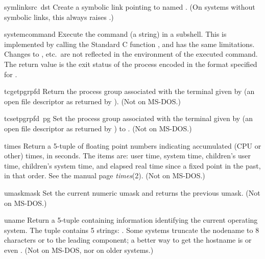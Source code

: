 \begin{funcdesc}{symlink}{src\, dst}
Create a symbolic link pointing to  named .  (On
systems without symbolic links, this always raises
.)
\end{funcdesc}

\begin{funcdesc}{system}{command}
Execute the command (a string) in a subshell.  This is implemented by
calling the Standard C function , and has the same
limitations.  Changes to ,  etc.\ are
not reflected in the environment of the executed command.  The return
value is the exit status of the process encoded in the format
specified for .
\end{funcdesc}

\begin{funcdesc}{tcgetpgrp}{fd}
Return the process group associated with the terminal given by
 (an open file descriptor as returned by ).
(Not on MS-DOS.)
\end{funcdesc}

\begin{funcdesc}{tcsetpgrp}{fd\, pg}
Set the process group associated with the terminal given by
 (an open file descriptor as returned by )
to .
(Not on MS-DOS.)
\end{funcdesc}

\begin{funcdesc}{times}{}
Return a 5-tuple of floating point numbers indicating accumulated (CPU
or other)
times, in seconds.  The items are: user time, system time, children's
user time, children's system time, and elapsed real time since a fixed
point in the past, in that order.  See the \UNIX{}
manual page {\it times}(2).  (Not on MS-DOS.)
\end{funcdesc}

\begin{funcdesc}{umask}{mask}
Set the current numeric umask and returns the previous umask.
(Not on MS-DOS.)
\end{funcdesc}

\begin{funcdesc}{uname}{}
Return a 5-tuple containing information identifying the current
operating system.  The tuple contains 5 strings:
.
Some systems truncate the nodename to 8
characters or to the leading component; a better way to get the
hostname is  or even
.
(Not on MS-DOS, nor on older \UNIX{} systems.)
\end{funcdesc}

